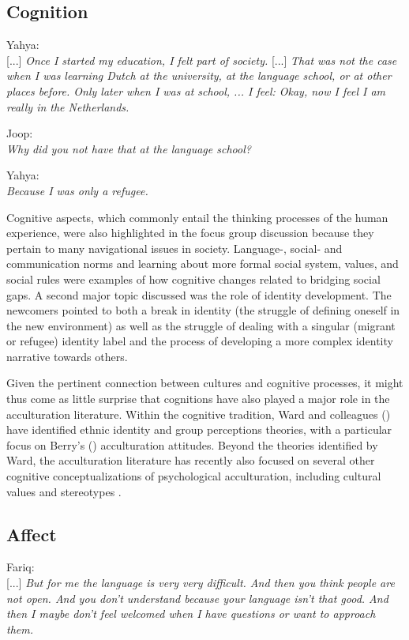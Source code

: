 \documentclass[man, 12pt, a4paper]{apa7}
\begin{document}
\subsection{Cognition}
\begin{displayquote}
    Yahya:\\
    {[...]} \textit{Once I started my education, I felt part of society.} {[...]} \textit{That was not the case when I was learning Dutch at the university, at the language school, or at other places before. Only later when I was at school, ... I feel: Okay, now I feel I am really in the Netherlands.}
    
    Joop:\\
    \textit{Why did you not have that at the language school?}
    
    Yahya:\\
    \textit{Because I was only a refugee.}
\end{displayquote}

Cognitive aspects, which commonly entail the thinking processes of the human experience, were also highlighted in the focus group discussion because they pertain to many navigational issues in society. Language-, social- and communication norms and learning about more formal social system, values, and social rules were examples of how cognitive changes related to bridging social gaps. A second major topic discussed was the role of identity development. The newcomers pointed to both a break in identity (the struggle of defining oneself in the new environment) as well as the struggle of dealing with a singular (migrant or refugee) identity label and the process of developing a more complex identity narrative towards others.

Given the pertinent connection between cultures and cognitive processes, it might thus come as little surprise that cognitions have also played a major role in the acculturation literature. Within the cognitive tradition, Ward and colleagues (\citeyear{Ward2001, Ward2019}) have identified ethnic identity and group perceptions theories, with a particular focus on Berry's (\citeyear{Berry1997b}) acculturation attitudes. Beyond the theories identified by Ward, the acculturation literature has recently also focused on several other cognitive conceptualizations of psychological acculturation, including cultural values \citep[e.g.,][]{Marin2003} and stereotypes \citep[e.g.,][]{Stanciu2018}. 

\subsection{Affect}
\begin{displayquote}
    Fariq:\\
    {[...]} \textit{But for me the language is very very difficult. And then you think people are not open. And you don't understand because your language isn't that good. And then I maybe don't feel welcomed when I have questions or want to approach them.}
\end{displayquote}
\end{document}
